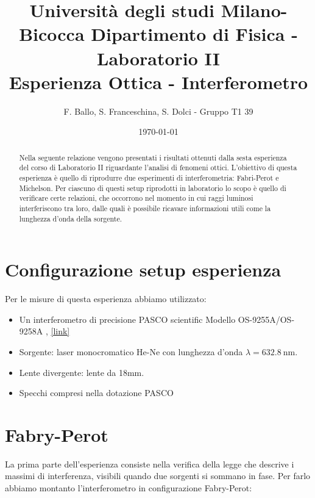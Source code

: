 \documentclass[letterpaper,12pt]{article}
\begin{document}
\title{{\small Università degli studi Milano-Bicocca  Dipartimento di Fisica - Laboratorio II }\\
	Esperienza Ottica - Interferometro}
\author{F. Ballo, S. Franceschina, S. Dolci - Gruppo T1 39}
\date{\today}
\maketitle
\thispagestyle{logoheader}


\begin{abstract}
	Nella seguente relazione vengono presentati i risultati ottenuti dalla sesta esperienza del corso di 
    Laboratorio II riguardante l'analisi di fenomeni ottici.
    L'obiettivo di questa esperienza è quello di riprodurre due esperimenti di interferometria: Fabri-Perot e Michelson.
    Per ciascuno di questi setup riprodotti in laboratorio lo scopo è quello di verificare certe relazioni, che occorrono
    nel momento in cui raggi luminosi interferiscono tra loro, dalle quali è possibile ricavare informazioni utili come 
    la lunghezza d'onda della sorgente.
	\begin{adjustwidth}{-1cm}{-1cm}
	\end{adjustwidth}
\end{abstract}
\tableofcontents
\newpage

\section{Configurazione setup esperienza}
Per le misure di questa esperienza abbiamo utilizzato:

\begin{itemize}
    \item Un interferometro di precisione PASCO scientific Modello OS-9255A/OS-9258A , \href{https://www.pasco.com/products/lab-apparatus/light-and-optics/advanced-optics/os-9255}{[link]}
    \item Sorgente: laser monocromatico He-Ne con lunghezza d'onda $\lambda = \SI{632.8}{\nano\meter}$.
    \item Lente divergente: lente da 18mm.
    \item Specchi compresi nella dotazione PASCO
\end{itemize}


\section{Fabry-Perot}
La prima parte dell'esperienza consiste nella verifica della legge che descrive
i massimi di interferenza, visibili quando due sorgenti si sommano in fase. 
Per farlo abbiamo montanto l'interferometro in configurazione Fabry-Perot:
\end{document}
